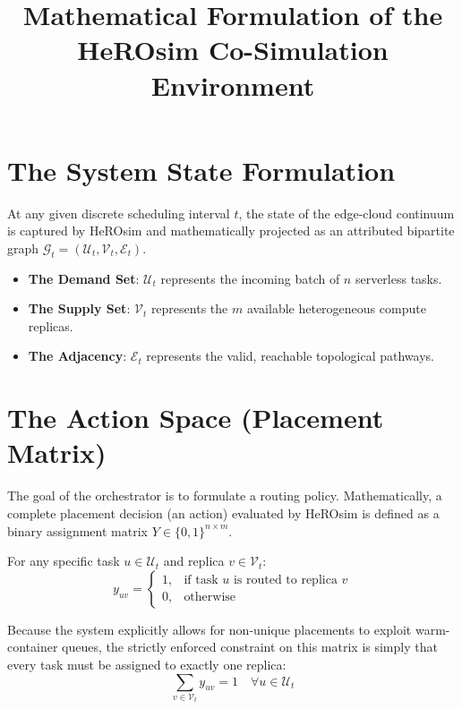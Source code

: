 \documentclass[11pt]{article}
\title{Mathematical Formulation of the HeROsim Co-Simulation Environment}
\author{}
\date{}
\begin{document}
\maketitle

\section{The System State Formulation}
At any given discrete scheduling interval $t$, the state of the edge-cloud continuum is captured by HeROsim and mathematically projected as an attributed bipartite graph $\mathcal{G}_t = (\mathcal{U}_t, \mathcal{V}_t, \mathcal{E}_t)$. 
\begin{itemize}
    \item \textbf{The Demand Set}: $\mathcal{U}_t$ represents the incoming batch of $n$ serverless tasks.
    \item \textbf{The Supply Set}: $\mathcal{V}_t$ represents the $m$ available heterogeneous compute replicas.
    \item \textbf{The Adjacency}: $\mathcal{E}_t$ represents the valid, reachable topological pathways.
\end{itemize}

\section{The Action Space (Placement Matrix)}
The goal of the orchestrator is to formulate a routing policy. Mathematically, a complete placement decision (an action) evaluated by HeROsim is defined as a binary assignment matrix $Y \in \{0, 1\}^{n \times m}$.

For any specific task $u \in \mathcal{U}_t$ and replica $v \in \mathcal{V}_t$:
\begin{equation}
y_{uv} = 
\begin{cases} 
1, & \text{if task } u \text{ is routed to replica } v \\ 
0, & \text{otherwise} 
\end{cases}
\end{equation}

Because the system explicitly allows for non-unique placements to exploit warm-container queues, the strictly enforced constraint on this matrix is simply that every task must be assigned to exactly one replica:
\begin{equation}
\sum_{v \in \mathcal{V}_t} y_{uv} = 1 \quad \forall u \in \mathcal{U}_t
\end{equation}
\end{document}
